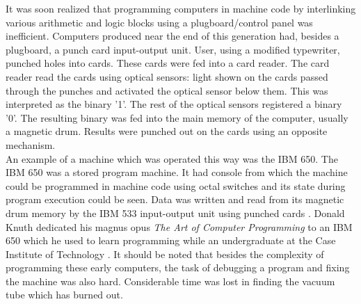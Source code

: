 It was soon realized that programming computers in machine code by interlinking various arithmetic and logic blocks using a plugboard/control panel was inefficient. Computers produced near the end of this generation had, besides a plugboard, a punch card input-output unit. User, using a modified typewriter, punched holes into cards. These cards were fed into a card reader. The card reader read the cards using optical sensors: light shown on the cards passed through the punches and activated the optical sensor below them. This was interpreted as the binary '1'. The rest of the optical sensors registered a binary '0'. The resulting binary was fed into the main memory of the computer, usually a magnetic drum. Results were punched out on the cards using an opposite mechanism.\\
An example of a machine which was operated this way was the IBM 650. The IBM 650 was a stored program machine. It had console from which the machine could be programmed in machine code using octal switches and its state during program execution could be seen. Data was written and read from its magnetic drum memory by the IBM 533 input-output unit using punched cards \cite{andree1958programming}. Donald Knuth dedicated his magnus opus \textit{The Art of Computer Programming} to an IBM 650 which he used to learn programming while an undergraduate at the Case Institute of Technology \cite{knuth1997art}.
It should be noted that besides the complexity of programming these early computers, the task of debugging a program and fixing the machine was also hard. Considerable time was lost in finding the vacuum tube which has burned out.

